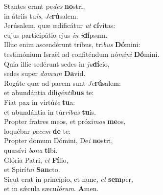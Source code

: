 \evenverse Stantes erant pe\textit{des} \textbf{no}stri,~\*\\
\evenverse in átriis tu\textit{is}, \textit{Je}\textbf{rú}salem.\\
\oddverse Jerúsalem, quæ ædificátur \textit{ut} \textbf{cí}vitas:~\*\\
\oddverse cujus participátio ejus \textit{in} \textit{i}\textbf{dí}psum.\\
\evenverse Illuc enim ascendérunt tribus, tri\textit{bus} \textbf{Dó}mini:~\*\\
\evenverse testimónium Israël ad confiténdum nó\textit{mi}\textit{ni} \textbf{Dó}mini.\\
\oddverse Quia illic sedérunt sedes in \textit{ju}\textbf{dí}cio,~\*\\
\oddverse sedes super \textit{do}\textit{mum} \textbf{Da}vid.\\
\evenverse Rogáte quæ ad pacem sunt \textit{Je}\textbf{rú}salem:~\*\\
\evenverse et abundántia dili\textit{gén}\textit{ti}\textbf{bus} te:\\
\oddverse Fiat pax in virtú\textit{te} \textbf{tu}a:~\*\\
\oddverse et abundántia in túr\textit{ri}\textit{bus} \textbf{tu}is.\\
\evenverse Propter fratres meos, et próxi\textit{mos} \textbf{me}os,~\*\\
\evenverse loquébar \textit{pa}\textit{cem} \textbf{de} te:\\
\oddverse Propter domum Dómini, De\textit{i} \textbf{no}stri,~\*\\
\oddverse quæsívi \textit{bo}\textit{na} \textbf{ti}bi.\\
\evenverse Glória Patri, \textit{et} \textbf{Fí}lio,~\*\\
\evenverse et Spirí\textit{tu}\textit{i} \textbf{San}cto.\\
\oddverse Sicut erat in princípio, et nunc, \textit{et} \textbf{sem}per,~\*\\
\oddverse et in sǽcula sæcu\textit{ló}\textit{rum}. \textbf{A}men.\\
